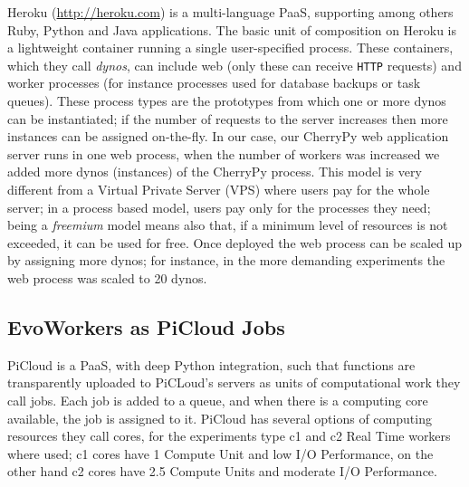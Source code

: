 Heroku (\url{http://heroku.com}) is a multi-language PaaS, supporting among others Ruby, Python and Java applications. The basic unit of composition on
Heroku is a lightweight container running a single user-specified
process. These containers, which they call {\em dynos}, can include web
(only these can receive {\tt HTTP} requests) and worker processes
(for instance processes used for database backups or task queues).
These  process types are the prototypes from which one or more dynos 
can be instantiated; if the number of requests to the server increases then 
more instances can be assigned on-the-fly. In our case, our CherryPy 
web application server runs in one web process, when the number 
of workers was increased we added more dynos (instances) of the 
CherryPy process. This model is very different from a Virtual Private Server (VPS) where users pay for the whole server; in a process based model, users pay only for the processes they need; being a {\em freemium} model means also that, if a minimum level of resources is not exceeded, it can be used for
free. 
Once deployed the web process can be scaled up by assigning more dynos;
for instance, in the more demanding experiments the web process was scaled to 20 dynos.


\subsection{EvoWorkers as PiCloud Jobs}
PiCloud is a PaaS, with deep Python integration, such that functions are transparently uploaded to PiCLoud's 
servers as units of computational work they call jobs. 
Each job is added to a queue, and when there is a computing core available, 
the job is assigned to it. PiCloud has several options of computing resources they call cores,
for the experiments type c1 and c2 Real Time workers where used; c1 cores have 1 Compute Unit and low I/O Performance,
on the other hand c2 cores have 2.5 Compute Units and moderate I/O Performance.




